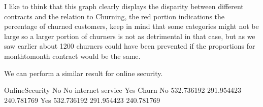 \documentclass[letterpaper,10pt,english]{jupyterBook}
\begin{document}
\begin{sphinxVerbatim}[commandchars=\\\{\}]
    
     
\end{sphinxVerbatim}

\noindent{}

\sphinxAtStartPar
I like to think that this graph clearly displays the disparity between different contracts and the relation to Churning, the red portion indications the percentage of churned customers, keep in mind that some categories might not be large so a larger portion of churners is not as detrimental in that case, but as we saw earlier about 1200 churners could have been prevented if the proportions for month\sphinxhyphen{}to\sphinxhyphen{}month contract would be the same.

\sphinxAtStartPar
We can perform a similar result for online security.

\begin{sphinxVerbatim}[commandchars=\\\{\}]
\PYG{p}{[}\PYG{p}{]}\PYG{p}{[}\PYG{p}{]}
\end{sphinxVerbatim}

\begin{sphinxVerbatim}[commandchars=\\\{\}]
OnlineSecurity          No  No internet service         Yes
Churn                                                      
No             \PYGZhy{}532.736192           291.954423  240.781769
Yes             532.736192          \PYGZhy{}291.954423 \PYGZhy{}240.781769
\end{sphinxVerbatim}
\end{document}
